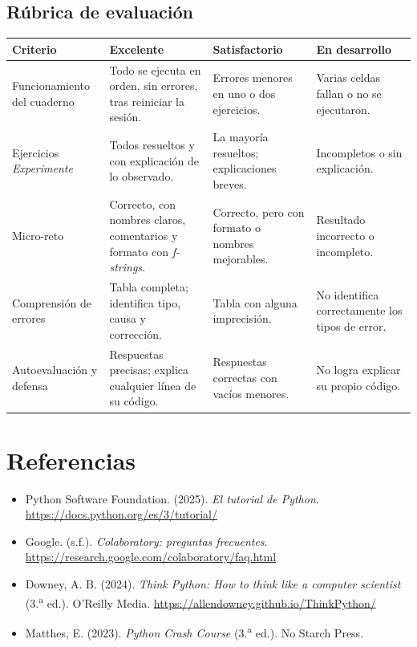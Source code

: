 \documentclass[11pt,a4paper]{article}
\begin{document}
\subsection{Rúbrica de evaluación}
\begin{center}
\renewcommand{\arraystretch}{1.35}
\begin{tabularx}{\textwidth}{>{\raggedright\arraybackslash}p{3.6cm} X X X}
\toprule
\textbf{Criterio} & \textbf{Excelente} & \textbf{Satisfactorio} & \textbf{En desarrollo} \\
\midrule
Funcionamiento del cuaderno &
Todo se ejecuta en orden, sin errores, tras reiniciar la sesión. &
Errores menores en uno o dos ejercicios. &
Varias celdas fallan o no se ejecutaron. \\
Ejercicios \emph{Experimente} &
Todos resueltos y con explicación de lo observado. &
La mayoría resueltos; explicaciones breves. &
Incompletos o sin explicación. \\
Micro-reto &
Correcto, con nombres claros, comentarios y formato con \emph{f-strings}. &
Correcto, pero con formato o nombres mejorables. &
Resultado incorrecto o incompleto. \\
Comprensión de errores &
Tabla completa; identifica tipo, causa y corrección. &
Tabla con alguna imprecisión. &
No identifica correctamente los tipos de error. \\
Autoevaluación y defensa &
Respuestas precisas; explica cualquier línea de su código. &
Respuestas correctas con vacíos menores. &
No logra explicar su propio código. \\
\bottomrule
\end{tabularx}
\end{center}

\section{Referencias}
\begin{itemize}
  \item Python Software Foundation. (2025). \emph{El tutorial de Python}. \url{https://docs.python.org/es/3/tutorial/}
  \item Google. (s.f.). \emph{Colaboratory: preguntas frecuentes}. \url{https://research.google.com/colaboratory/faq.html}
  \item Downey, A. B. (2024). \emph{Think Python: How to think like a computer scientist} (3.\textsuperscript{a} ed.). O'Reilly Media. \url{https://allendowney.github.io/ThinkPython/}
  \item Matthes, E. (2023). \emph{Python Crash Course} (3.\textsuperscript{a} ed.). No Starch Press.
\end{itemize}
\end{document}
